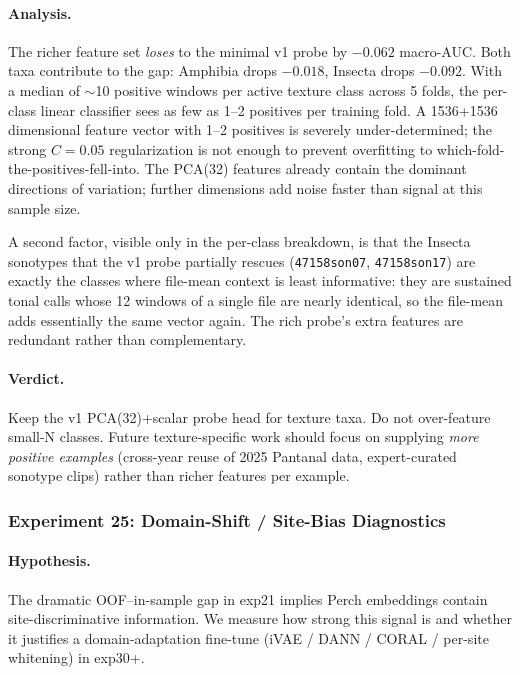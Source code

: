 \paragraph{Analysis.}
The richer feature set \emph{loses} to the minimal v1 probe by
$-0.062$ macro-AUC. Both taxa contribute to the gap: Amphibia drops
$-0.018$, Insecta drops $-0.092$. With a median of $\sim$10 positive
windows per active texture class across 5 folds, the per-class linear
classifier sees as few as 1--2 positives per training fold. A 1536+1536
dimensional feature vector with 1--2 positives is severely under-determined;
the strong $C{=}0.05$ regularization is not enough to prevent overfitting
to which-fold-the-positives-fell-into. The PCA(32) features already
contain the dominant directions of variation; further dimensions add
noise faster than signal at this sample size.

A second factor, visible only in the per-class breakdown, is that the
Insecta sonotypes that the v1 probe partially rescues
(\texttt{47158son07}, \texttt{47158son17}) are exactly the classes where
file-mean context is least informative: they are sustained tonal calls
whose 12 windows of a single file are nearly identical, so the file-mean
adds essentially the same vector again. The rich probe's extra features
are redundant rather than complementary.

\paragraph{Verdict.}
Keep the v1 PCA(32)+scalar probe head for texture taxa. Do not over-feature
small-N classes. Future texture-specific work should focus on supplying
\emph{more positive examples} (cross-year reuse of 2025 Pantanal data,
expert-curated sonotype clips) rather than richer features per example.

\subsubsection{Experiment 25: Domain-Shift / Site-Bias Diagnostics}
\label{sec:exp25}

\paragraph{Hypothesis.}
The dramatic OOF--in-sample gap in exp21 implies Perch embeddings
contain site-discriminative information. We measure how strong this
signal is and whether it justifies a domain-adaptation fine-tune
(iVAE / DANN / CORAL / per-site whitening) in exp30+.

